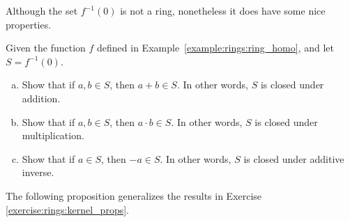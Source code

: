 Although the set $f^{-1}(0)$ is not a ring, nonetheless it does have some nice properties.

\begin{exercise}\label{exercise:rings:kernel_props}
Given the function $f$ defined in Example~\ref{example:rings:ring_homo}, and let $S=f^{-1}(0)$.
\begin{enumerate}[(a)]
\item Show that if $a,b \in S$, then $a+b \in S$.  In other words, $S$ is closed under addition.
\item Show that if $a,b \in S$, then $a\cdot b \in S$.  In other words, $S$ is closed under multiplication.

\item Show that if $a \in S$, then $-a \in S$.  In other words, $S$ is closed under additive inverse.
\end{enumerate}
\end{exercise}

The following proposition generalizes the results in Exercise \ref{exercise:rings:kernel_props}.

